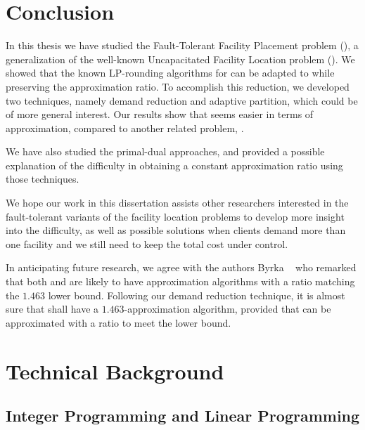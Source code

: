 \documentclass[oneside,final]{ucr}
\begin{document}
\chapter{Conclusion} \label{ch: conclusion} 

In this thesis we have studied the Fault-Tolerant Facility
Placement problem ({\FTFP}), a generalization of the
well-known Uncapacitated Facility Location problem
({\UFL}). We showed that the known LP-rounding algorithms
for {\UFL} can be adapted to {\FTFP} while preserving the
approximation ratio. To accomplish this reduction, we
developed two techniques, namely demand reduction and
adaptive partition, which could be of more general
interest. Our results show that {\FTFP} seems easier in
terms of approximation, compared to another related problem,
{\FTFL}.

We have also studied the primal-dual approaches, and
provided a possible explanation of the difficulty in
obtaining a constant approximation ratio using those
techniques.

We hope our work in this dissertation assists other
researchers interested in the fault-tolerant variants of the
facility location problems to develop more insight into the
difficulty, as well as possible solutions when clients
demand more than one facility and we still need to keep the
total cost under control.

In anticipating future research, we agree with the authors
Byrka {\etal}~\cite{ByrkaSS10} who remarked that both
{\UFL} and {\FTFL} are likely to have approximation
algorithms with a ratio matching the $1.463$ lower
bound. Following our demand reduction technique, it is
almost sure that {\FTFP} shall have a $1.463$-approximation
algorithm, provided that {\FTFL} can be approximated with a
ratio to meet the lower bound.




\appendix
\chapter{Technical Background}

\section{Integer Programming and Linear Programming}
\label{sec: ILP}
\end{document}
